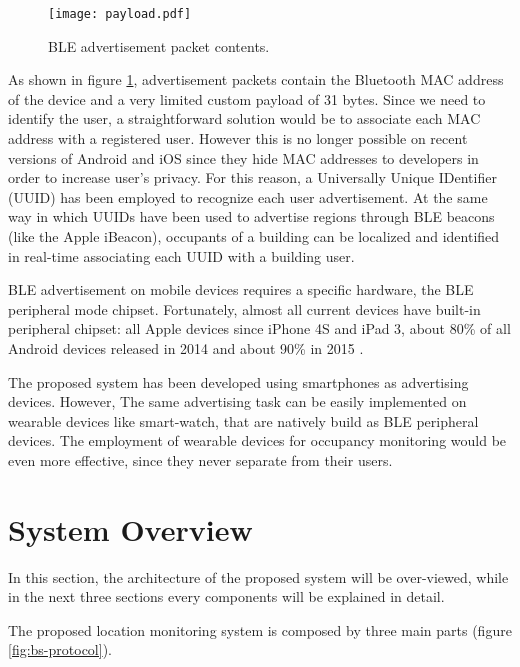 \begin{figure}[h!tb]
\centering
\texttt{[image: payload.pdf]}
\caption[BLE advertisement packet contents.]{BLE advertisement packet contents.}
\label{fig:payload}
\end{figure}

As shown in figure \ref{fig:payload}, advertisement packets contain the Bluetooth MAC address of the device and a very limited custom payload of 31 bytes. Since we need to identify the user, a straightforward solution would be to associate each MAC address with a registered user. However this is no longer possible on recent versions of Android and iOS since they hide MAC addresses to developers in order to increase user's privacy. For this reason, a Universally Unique IDentifier (UUID) has been employed to recognize each user advertisement.
At the same way in which UUIDs have been used to advertise regions through BLE beacons (like the Apple iBeacon), occupants of a building can be localized and identified in real-time associating each UUID with a building user.

\smallskip
BLE advertisement on mobile devices requires a specific hardware, the BLE peripheral mode chipset. Fortunately, almost all current devices have built-in peripheral chipset: all Apple devices since iPhone 4S and iPad 3, about 80\% of all Android devices released in 2014 and about 90\% in 2015 \cite{RadiusNetwork2016}.

\medskip
The proposed system has been developed using smartphones as advertising devices. However, The same advertising task can be easily implemented on wearable devices like smart-watch, that are natively build as BLE peripheral devices. The employment of wearable devices for occupancy monitoring would be even more effective, since they never separate from their users.

\section{System Overview}
\label{sec:overview}
In this section, the architecture of the proposed system will be over-viewed, while in the next three sections every components will be explained in detail.

The proposed location monitoring system is composed by three main parts (figure \ref{fig:bs-protocol}).

